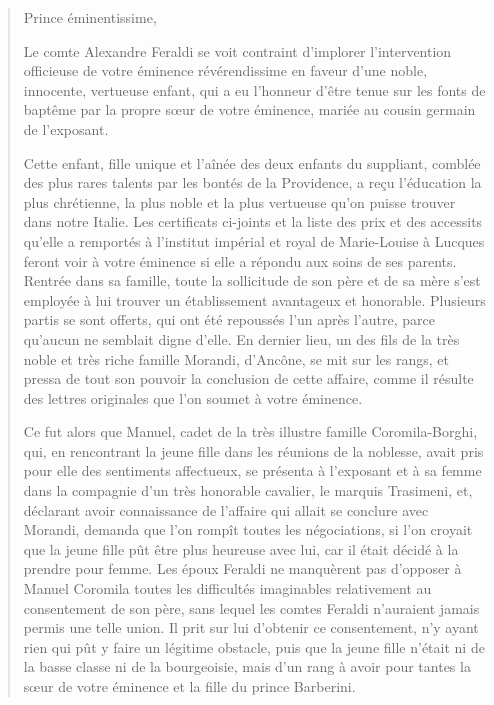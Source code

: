 \begin{quote}

Prince éminentissime,

Le comte Alexandre Feraldi se voit contraint d'implorer l'intervention officieuse de votre éminence révérendissime en faveur d'une noble, innocente, vertueuse enfant, qui a eu l'honneur d'être tenue sur les fonts de baptême par la propre s\oe{}ur de votre éminence, mariée au cousin germain de l'exposant.

Cette enfant, fille unique et l'aînée des deux enfants du suppliant, comblée des plus rares talents par les bontés de la Providence, a reçu l'éducation la plus chrétienne, la plus noble et la plus vertueuse qu'on puisse trouver dans notre Italie. Les certificats ci-joints et la liste des prix et des accessits qu'elle a remportés à l'institut impérial et royal de Marie-Louise à Lucques feront voir à votre éminence si elle a répondu aux soins de ses parents. Rentrée dans sa famille, toute la sollicitude de son père et de sa mère s'est employée à lui trouver un établissement avantageux et honorable. Plusieurs partis se sont offerts, qui ont été repoussés l'un après l'autre, parce qu'aucun ne semblait digne d'elle. En dernier lieu, un des fils de la très noble et très riche famille Morandi, d'Ancône, se mit sur les rangs, et pressa de tout son pouvoir la conclusion de cette affaire, comme il résulte des lettres originales que l'on soumet à votre éminence.

Ce fut alors que Manuel, cadet de la très illustre famille Coromila-Borghi, qui, en rencontrant la jeune fille dans les réunions de la noblesse, avait pris pour elle des sentiments affectueux, se présenta à l'exposant et à sa femme dans la compagnie d'un très honorable cavalier, le marquis Trasimeni, et, déclarant avoir connaissance de l'affaire qui allait se conclure avec Morandi, demanda que l'on rompît toutes les négociations, si l'on croyait que la jeune fille pût être plus heureuse avec lui, car il était décidé à la prendre pour femme. Les époux Feraldi ne manquèrent pas d'opposer à Manuel Coromila toutes les difficultés imaginables relativement au consentement de son père, sans lequel les comtes Feraldi n'auraient jamais permis une telle union. Il prit sur lui d'obtenir ce consentement, n'y ayant rien qui pût y faire un légitime obstacle, puis que la jeune fille n'était ni de la basse classe ni de la bourgeoisie, mais d'un rang à avoir pour tantes la s\oe{}ur de votre éminence et la fille du prince Barberini.


\end{quote}
